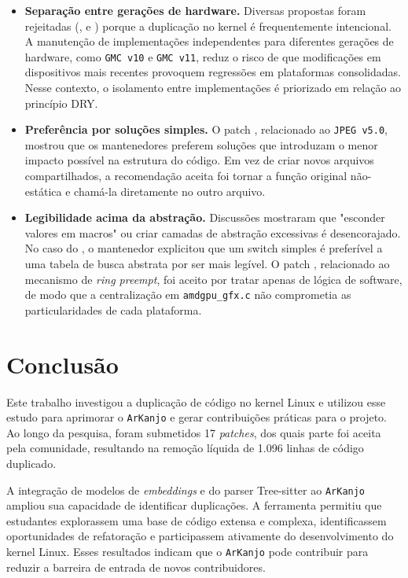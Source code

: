\documentclass[twocolumn]{article}
\begin{document}
\begin{itemize}
    \item \textbf{Separação entre gerações de hardware.} Diversas propostas foram rejeitadas (,  e ) porque a duplicação no kernel é frequentemente intencional. A manutenção de implementações independentes para diferentes gerações de hardware, como \texttt{GMC v10} e \texttt{GMC v11}, reduz o risco de que modificações em dispositivos mais recentes provoquem regressões em plataformas consolidadas. Nesse contexto, o isolamento entre implementações é priorizado em relação ao princípio DRY.

    \item \textbf{Preferência por soluções simples.} O patch , relacionado ao \texttt{JPEG v5.0}, mostrou que os mantenedores preferem soluções que introduzam o menor impacto possível na estrutura do código. Em vez de criar novos arquivos compartilhados, a recomendação aceita foi tornar a função original não-estática e chamá-la diretamente no outro arquivo.

    \item \textbf{Legibilidade acima da abstração.} Discussões mostraram que "esconder valores em macros" ou criar camadas de abstração excessivas é desencorajado. No caso do , o mantenedor explicitou que um switch simples é preferível a uma tabela de busca abstrata por ser mais legível. O patch , relacionado ao mecanismo de \textit{ring preempt}, foi aceito por tratar apenas de lógica de software, de modo que a centralização em \verb|amdgpu_gfx.c| não comprometia as particularidades de cada plataforma.
\end{itemize}

\section{Conclusão}

Este trabalho investigou a duplicação de código no kernel Linux e utilizou esse estudo para aprimorar o \texttt{ArKanjo} e gerar contribuições práticas para o projeto. Ao longo da pesquisa, foram submetidos 17 \textit{patches}, dos quais parte foi aceita pela comunidade, resultando na remoção líquida de 1.096 linhas de código duplicado.

A integração de modelos de \textit{embeddings} e do parser Tree-sitter ao \texttt{ArKanjo} ampliou sua capacidade de identificar duplicações. A ferramenta permitiu que estudantes explorassem uma base de código extensa e complexa, identificassem oportunidades de refatoração e participassem ativamente do desenvolvimento do kernel Linux. Esses resultados indicam que o \texttt{ArKanjo} pode contribuir para reduzir a barreira de entrada de novos contribuidores.
\end{document}
